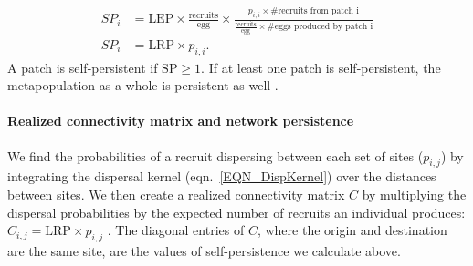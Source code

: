 \documentclass[12pt, oneside]{article}   	%
\begin{document}
\begin{equation}
\begin{split}
SP_i &= \text{LEP} \times \frac{\text{recruits}}{\text{egg}} \times \frac{p_{i,i} \times \text{\# recruits from patch i}}{\frac{\text{recruits}}{\text{egg}} \times \text{\# eggs produced by patch i}} \\ 
SP_i &= \text{LRP} \times p_{i,i}. \label{EQN_SP}  %
\end{split}
\end{equation}
A patch is self-persistent if $\text{SP} \geq 1$. If at least one patch is self-persistent, the metapopulation as a whole is persistent as well \citep{hastings_persistence_2006, burgess2014beyond}.

\paragraph*{Realized connectivity matrix and network persistence}
We find the probabilities of a recruit dispersing between each set of sites ($p_{i,j}$) by integrating the dispersal kernel (eqn.\ \ref{EQN_DispKernel}) over the distances between sites. We then create a realized connectivity matrix $C$ by multiplying the dispersal probabilities by the expected number of recruits an individual produces: $C_{i,j} = \text{LRP} \times p_{i,j}$ \citep[][though we include egg-recruit survival in LRP, rather than in $p_{i,j}$ as they do]{burgess2014beyond}. The diagonal entries of $C$, where the origin and destination are the same site, are the values of self-persistence we calculate above. 
\end{document}
